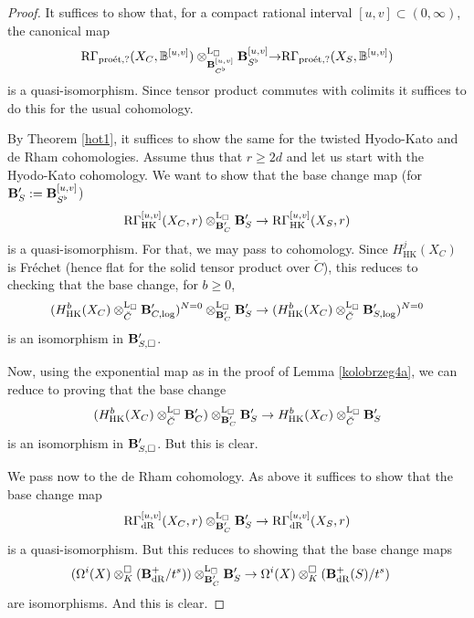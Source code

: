 \documentclass[10pt,a4paper]{amsart}
\def\B{{\bf B}}
\def\R{{\mathrm R}}
\newcommand{\LL}{\operatorname{L} }
\newcommand{\dr}{\operatorname{dR} }
\newcommand{\hk}{\operatorname{HK} }
\newcommand{\proeet}{\operatorname{pro\acute{e}t} }
\begin{document}
\begin{proof}
It suffices to show that, for a compact rational interval $[u,v]\subset (0,\infty)$, 
the canonical map
$$\R\Gamma_{\proeet,?}(X_C,{\mathbb B}^{[u,v]})\otimes^{\LL_{\Box}}_{\B^{[u,v]}_{C^{\flat}}}
\B_{S^{\flat}}^{ [u,v]}{\to}\R\Gamma_{\proeet,?}(X_S,{\mathbb B}^{[u,v]})$$
is a quasi-isomorphism. Since tensor product commutes with colimits it suffices to do this for  the usual cohomology. 

  By  Theorem \ref{hot1}, it suffices to show the same for the twisted Hyodo-Kato and de Rham cohomologies. Assume thus that $r\geq 2d$
 and let us start  with the Hyodo-Kato cohomology. We want to show that  the  base change map 
(for $\B^{\prime}_S:=\B_{S^{\flat}}^{[u,v]}$)
 $$
 \R\Gamma_{\hk}^{{[u,v]}}(X_C,r)\otimes^{\LL_{\Box}}_{\B^{\prime}_C} \B^{\prime}_{S} \to \R\Gamma_{\hk}^{{[u,v]}}(X_S,r)
  $$
 is a quasi-isomorphism. 
For that,  we may pass to cohomology. Since $H^j_{\hk}(X_C)$ is Fr\'echet (hence flat for the solid tensor product over $\breve{C}$),  this reduces
  to checking that the base change, for $b\geq 0$, 
$$
  (H^b_{\hk}(X_C)\otimes^{\LL_{\Box}}_{\breve{C}}\B^{\prime}_{C,\log})^{N=0}\otimes^{\LL_{\Box}}_{\B^{\prime}_C} \B^{\prime}_S
  \to  (H^b_{\hk}(X_C)\otimes^{\LL_{\Box}}_{\breve{C}}\B^{\prime}_{S,\log})^{N=0}
  $$
  is an isomorphism in $\B^{\prime}_{S, \Box}$. 
  
    Now,
     using the exponential map as in the proof of Lemma \ref{kolobrzeg4a},  we can  reduce  to proving that the base change
  $$
 (H^b_{\hk}(X_C)\otimes^{\LL_{\Box}}_{\breve{C}}\B^{\prime}_C)\otimes^{\LL_{\Box}}_{\B^{\prime}_C} \B^{\prime}_S
  \to  H^b_{\hk}(X_C)\otimes^{\LL_{\Box}}_{\breve{C}}\B^{\prime}_S
  $$
  is an isomorphism in $\B^{\prime}_{S,\Box}$. But this is clear. 
  
  
  
   We pass now to  the de Rham cohomology.  As above it suffices to show that the base change map
   $$
 \R\Gamma_{\dr}^{{[u,v]}}(X_C,r)\otimes^{\LL_{\Box}}_{\B^{\prime}_C} \B^{\prime}_{S} \to \R\Gamma_{\dr}^{{[u,v]}}(X_S,r)
  $$
 is a quasi-isomorphism. But this reduces to showing that the base change maps
 \begin{align*}
& (\Omega^i(X)\otimes^{\Box}_K(\B^+_{\dr}/t^s))
\otimes^{\LL_{\Box}}_{\B^{\prime}_C}\B^{\prime}_S\to  \Omega^i(X)\otimes^{\Box}_K(\B^+_{\dr}(S)/t^s)
 \end{align*}
 are isomorphisms. And this is clear.    
\end{proof}
\end{document}
